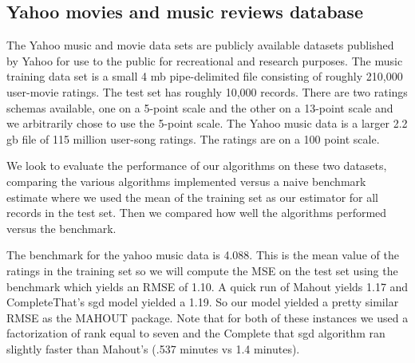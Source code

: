 \documentclass[12pt]{article}
\begin{document}
\subsection*{Yahoo movies and music reviews database}
The Yahoo music and movie data sets are publicly available datasets published by Yahoo for use to the public for recreational and research purposes. The music training data set is a small 4 mb pipe-delimited file consisting of roughly 210,000 user-movie ratings. The test set has roughly 10,000 records. There are two ratings schemas available, one on a 5-point scale and the other on a 13-point scale and we arbitrarily chose to use the 5-point scale. The Yahoo music data is a larger 2.2 gb file of 115 million user-song ratings. The ratings are on a 100 point scale.
 
We look to evaluate the performance of our algorithms on these two datasets, comparing the various algorithms implemented versus a naive benchmark estimate where we used the mean of the training set as our estimator for all records in the test set. Then we compared how well the algorithms performed versus the benchmark. 

The benchmark for the yahoo music data is 4.088. This is the mean value of the ratings in the training set so we will compute the MSE on the test set using the benchmark which yields an RMSE of 1.10. A quick run of Mahout yields 1.17 and CompleteThat's sgd model yielded a 1.19. So our model yielded a pretty similar RMSE as the MAHOUT package. Note that for both of these instances we used a factorization of rank equal to seven and the Complete that sgd algorithm ran slightly faster than Mahout's (.537 minutes vs 1.4 minutes). 

\begin{table}[h]
\centering
{}
\caption{RMSE vs Step Size vs Rank}
\end{table}
\end{document}
